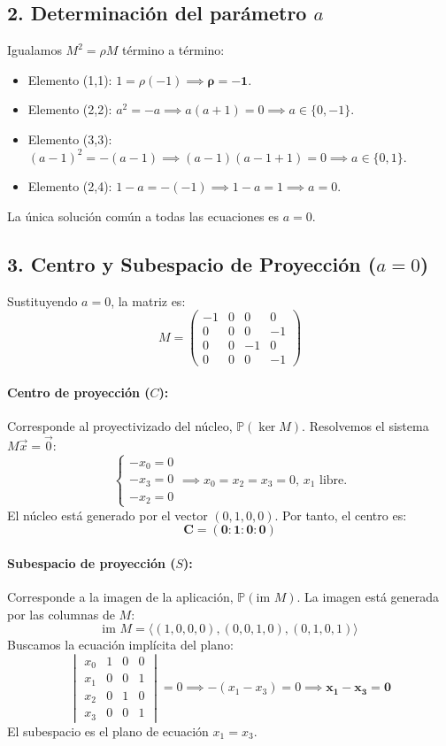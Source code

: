 {\subsection*{2. Determinación del parámetro $a$}

Igualamos $M^2 = \rho M$ término a término:
\begin{itemize}
    \item Elemento (1,1): $1 = \rho(-1) \implies \mathbf{\rho = -1}$.
    \item Elemento (2,2): $a^2 = -a \implies a(a+1) = 0 \implies a \in \{0, -1\}$.
    \item Elemento (3,3): $(a-1)^2 = -(a-1) \implies (a-1)(a-1+1) = 0 \implies a \in \{0, 1\}$.
    \item Elemento (2,4): $1-a = -(-1) \implies 1-a = 1 \implies a = 0$.
\end{itemize}
La única solución común a todas las ecuaciones es \textbf{$a = 0$}.

\subsection*{3. Centro y Subespacio de Proyección ($a=0$)}

Sustituyendo $a=0$, la matriz es:
\[
M = \begin{pmatrix} 
-1 & 0 & 0 & 0 \\ 
0 & 0 & 0 & -1 \\ 
0 & 0 & -1 & 0 \\ 
0 & 0 & 0 & -1 
\end{pmatrix}
\]

\paragraph{Centro de proyección ($C$):} Corresponde al proyectivizado del núcleo, $\mathbb{P}(\ker M)$. Resolvemos el sistema $M\vec{x} = \vec{0}$:
\[
\begin{cases} -x_0 = 0 \\ -x_3 = 0 \\ -x_2 = 0 \end{cases} \implies x_0=x_2=x_3=0, \, x_1 \text{ libre.}
\]
El núcleo está generado por el vector $(0, 1, 0, 0)$. Por tanto, el centro es:
\[ \mathbf{C = (0 : 1 : 0 : 0)} \]

\paragraph{Subespacio de proyección ($S$):} Corresponde a la imagen de la aplicación, $\mathbb{P}(\text{im } M)$. La imagen está generada por las columnas de $M$:
\[ \text{im } M = \langle (1,0,0,0), (0,0,1,0), (0,1,0,1) \rangle \]
Buscamos la ecuación implícita del plano:
\[
\begin{vmatrix} x_0 & 1 & 0 & 0 \\ x_1 & 0 & 0 & 1 \\ x_2 & 0 & 1 & 0 \\ x_3 & 0 & 0 & 1 \end{vmatrix} = 0 \implies -(x_1 - x_3) = 0 \implies \mathbf{x_1 - x_3 = 0}
\]
El subespacio es el plano de ecuación $x_1 = x_3$.
}


